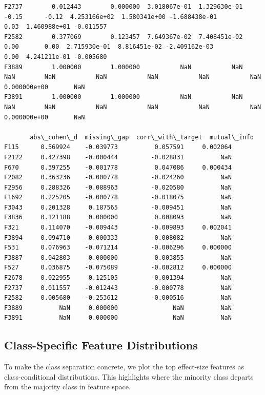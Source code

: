 \documentclass[11pt]{article}
\begin{document}
\begin{Verbatim}[commandchars=\\\{\}]
F2737        0.012443        0.000000  3.018067e-01  1.329630e-01      -0.15      -0.12  4.253166e+02  1.580341e+00 -1.688438e-01          0.03  1.460988e+01 -0.011557   
F2582        0.377069        0.123457  7.649367e-02  7.408451e-02       0.00       0.00  2.715930e-01  8.816451e-02 -2.409162e-03          0.00  4.241211e-01 -0.005680   
F3889        1.000000        1.000000           NaN           NaN        NaN        NaN           NaN           NaN           NaN           NaN  0.000000e+00       NaN   
F3891        1.000000        1.000000           NaN           NaN        NaN        NaN           NaN           NaN           NaN           NaN  0.000000e+00       NaN   

       abs\_cohen\_d  missing\_gap  corr\_with\_target  mutual\_info  
F115      0.569924    -0.039773          0.057591     0.002064  
F2122     0.427398    -0.000444         -0.028831          NaN  
F670      0.397255    -0.001778          0.047086     0.000434  
F2082     0.363236    -0.000778         -0.024260          NaN  
F2956     0.288326    -0.088963         -0.020580          NaN  
F1692     0.225205    -0.000778         -0.018075          NaN  
F3043     0.201328     0.187565         -0.009451          NaN  
F3836     0.121188     0.000000          0.008093          NaN  
F321      0.114070    -0.009443         -0.009893     0.002041  
F3894     0.094710    -0.000333         -0.008082          NaN  
F531      0.076963    -0.071214         -0.006296     0.000000  
F3887     0.042803     0.000000          0.003855          NaN  
F527      0.036875    -0.075089         -0.002812     0.000000  
F2678     0.022955     0.125105         -0.001394          NaN  
F2737     0.011557    -0.012443         -0.000778          NaN  
F2582     0.005680    -0.253612         -0.000516          NaN  
F3889          NaN     0.000000               NaN          NaN  
F3891          NaN     0.000000               NaN          NaN  
    \end{Verbatim}

    
    \subsection{Class-Specific Feature
Distributions}\label{class-specific-feature-distributions}

To make the class separation concrete, we plot the top effect-size
features as class-conditional distributions. This highlights where the
minority class departs from the majority class in feature space.
\end{document}
